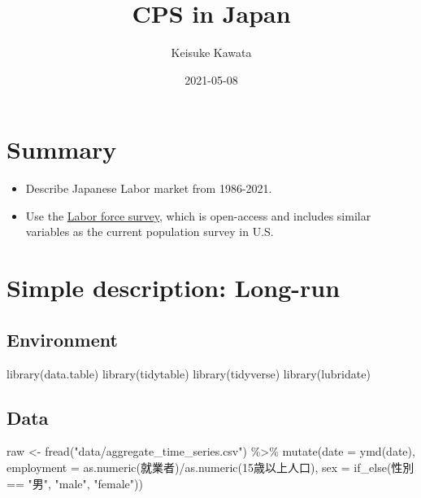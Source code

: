 \documentclass[
]{book}
\title{CPS in Japan}
\author{Keisuke Kawata}
\date{2021-05-08}
\newenvironment{Shaded}{\begin{snugshade}}{\end{snugshade}}
\newcommand{\AttributeTok}[1]{\textcolor[rgb]{0.77,0.63,0.00}{#1}}
\newcommand{\FunctionTok}[1]{\textcolor[rgb]{0.00,0.00,0.00}{#1}}
\newcommand{\NormalTok}[1]{#1}
\newcommand{\OtherTok}[1]{\textcolor[rgb]{0.56,0.35,0.01}{#1}}
\newcommand{\SpecialCharTok}[1]{\textcolor[rgb]{0.00,0.00,0.00}{#1}}
\newcommand{\StringTok}[1]{\textcolor[rgb]{0.31,0.60,0.02}{#1}}
\begin{document}
\maketitle

{
\setcounter{tocdepth}{1}
\tableofcontents
}
\hypertarget{summary}{%
\chapter{Summary}\label{summary}}

\begin{itemize}
\item
  Describe Japanese Labor market from 1986-2021.
\item
  Use the \href{https://www.stat.go.jp/english/data/roudou/index.html}{Labor force survey}, which is open-access and includes similar variables as the current population survey in U.S.
\end{itemize}

\hypertarget{simple-description-long-run}{%
\chapter{Simple description: Long-run}\label{simple-description-long-run}}

\hypertarget{environment}{%
\section{Environment}\label{environment}}

\begin{Shaded}
\begin{Highlighting}[]
\FunctionTok{library}\NormalTok{(data.table)}
\FunctionTok{library}\NormalTok{(tidytable)}
\FunctionTok{library}\NormalTok{(tidyverse)}
\FunctionTok{library}\NormalTok{(lubridate)}
\end{Highlighting}
\end{Shaded}

\hypertarget{data}{%
\section{Data}\label{data}}

\begin{Shaded}
\begin{Highlighting}[]
\NormalTok{raw }\OtherTok{\textless{}{-}} 
  \FunctionTok{fread}\NormalTok{(}\StringTok{"data/aggregate\_time\_series.csv"}\NormalTok{) }\SpecialCharTok{\%\textgreater{}\%}
  \FunctionTok{mutate}\NormalTok{(}\AttributeTok{date =} \FunctionTok{ymd}\NormalTok{(date),}
         \AttributeTok{employment =} \FunctionTok{as.numeric}\NormalTok{(就業者)}\SpecialCharTok{/}\FunctionTok{as.numeric}\NormalTok{(}\StringTok{\textasciigrave{}}\AttributeTok{15歳以上人口}\StringTok{\textasciigrave{}}\NormalTok{),}
         \AttributeTok{sex =} \FunctionTok{if\_else}\NormalTok{(性別 }\SpecialCharTok{==} \StringTok{"男"}\NormalTok{, }\StringTok{"male"}\NormalTok{, }\StringTok{"female"}\NormalTok{))}
\end{Highlighting}
\end{Shaded}
\end{document}
